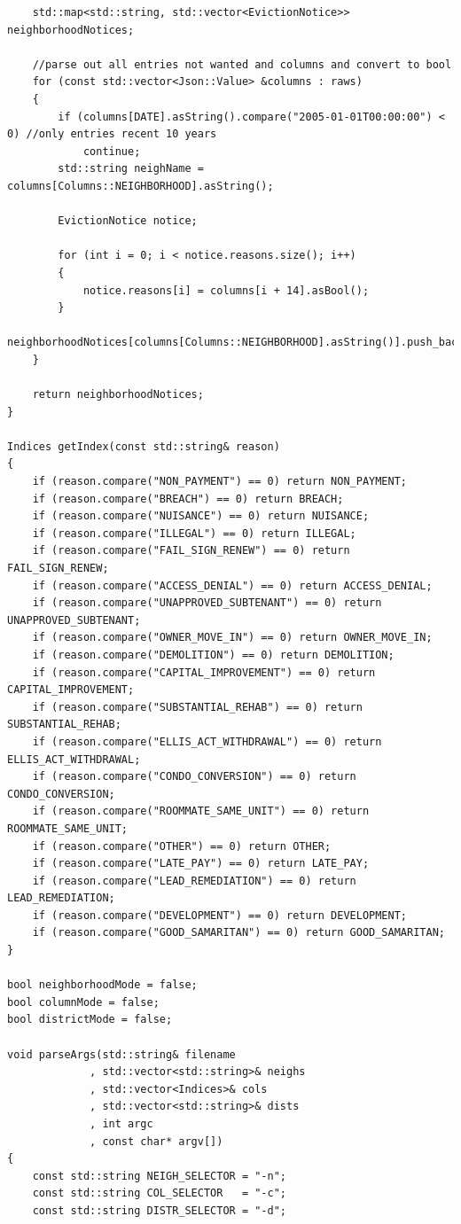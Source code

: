 \documentclass[]{article}
\begin{document}
\begin{lstlisting}
    std::map<std::string, std::vector<EvictionNotice>> neighborhoodNotices;

    //parse out all entries not wanted and columns and convert to bool
    for (const std::vector<Json::Value> &columns : raws)
    {
        if (columns[DATE].asString().compare("2005-01-01T00:00:00") < 0) //only entries recent 10 years
            continue;
        std::string neighName = columns[Columns::NEIGHBORHOOD].asString();

        EvictionNotice notice;

        for (int i = 0; i < notice.reasons.size(); i++)
        {
            notice.reasons[i] = columns[i + 14].asBool();
        }
        neighborhoodNotices[columns[Columns::NEIGHBORHOOD].asString()].push_back(notice);
    }

    return neighborhoodNotices;
}

Indices getIndex(const std::string& reason)
{
    if (reason.compare("NON_PAYMENT") == 0) return NON_PAYMENT;
    if (reason.compare("BREACH") == 0) return BREACH;
    if (reason.compare("NUISANCE") == 0) return NUISANCE;
    if (reason.compare("ILLEGAL") == 0) return ILLEGAL;
    if (reason.compare("FAIL_SIGN_RENEW") == 0) return FAIL_SIGN_RENEW;
    if (reason.compare("ACCESS_DENIAL") == 0) return ACCESS_DENIAL;
    if (reason.compare("UNAPPROVED_SUBTENANT") == 0) return UNAPPROVED_SUBTENANT;
    if (reason.compare("OWNER_MOVE_IN") == 0) return OWNER_MOVE_IN;
    if (reason.compare("DEMOLITION") == 0) return DEMOLITION;
    if (reason.compare("CAPITAL_IMPROVEMENT") == 0) return CAPITAL_IMPROVEMENT;
    if (reason.compare("SUBSTANTIAL_REHAB") == 0) return SUBSTANTIAL_REHAB;
    if (reason.compare("ELLIS_ACT_WITHDRAWAL") == 0) return ELLIS_ACT_WITHDRAWAL;
    if (reason.compare("CONDO_CONVERSION") == 0) return CONDO_CONVERSION;
    if (reason.compare("ROOMMATE_SAME_UNIT") == 0) return ROOMMATE_SAME_UNIT;
    if (reason.compare("OTHER") == 0) return OTHER;
    if (reason.compare("LATE_PAY") == 0) return LATE_PAY;
    if (reason.compare("LEAD_REMEDIATION") == 0) return LEAD_REMEDIATION;
    if (reason.compare("DEVELOPMENT") == 0) return DEVELOPMENT;
    if (reason.compare("GOOD_SAMARITAN") == 0) return GOOD_SAMARITAN;
}

bool neighborhoodMode = false;
bool columnMode = false;
bool districtMode = false;

void parseArgs(std::string& filename
             , std::vector<std::string>& neighs
             , std::vector<Indices>& cols
             , std::vector<std::string>& dists
             , int argc
             , const char* argv[])
{
    const std::string NEIGH_SELECTOR = "-n";
    const std::string COL_SELECTOR   = "-c";
    const std::string DISTR_SELECTOR = "-d";


\end{lstlisting}
\end{document}

